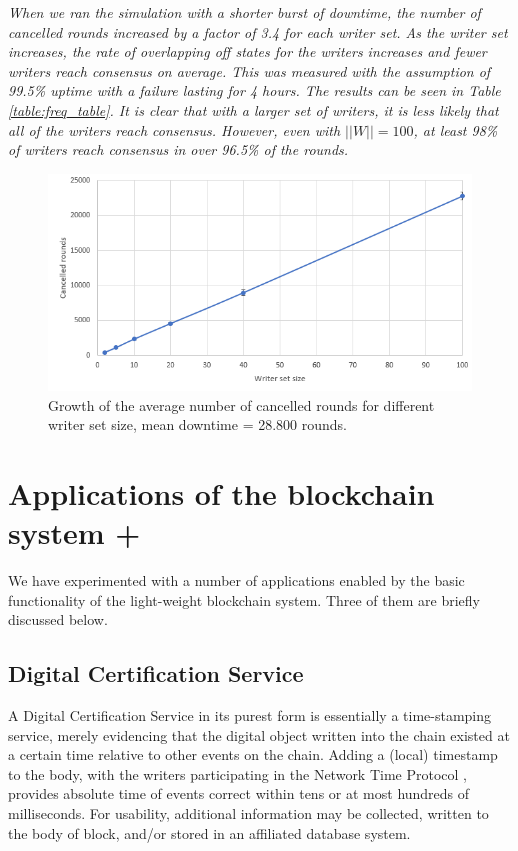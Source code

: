 \documentclass[10pt]{article}
\begin{document}
\emph{When we ran the simulation with a shorter burst of downtime, the number of cancelled rounds increased by a factor of 3.4 for each writer set. %
As the writer set increases, the rate of overlapping off states for the writers increases and fewer writers reach consensus on average. This was measured with the assumption of 99.5\% uptime with a failure lasting for 4 hours. The results can be seen in Table \ref{table:freq_table}. It is clear that with a larger set of writers, it is less likely that all of the writers reach consensus. However, even with $||W|| = 100$, at least 98\% of writers reach consensus in over 96.5\% of the rounds.}




\begin{figure}[]
    \centering
   \includegraphics[scale = 0.65]{images/graf.PNG}
    \caption{Growth of the average number of cancelled rounds for different writer set size, mean downtime = 28.800 rounds.}
    \label{fig:failure_rate}
\end{figure}



\section{Applications of the blockchain system +}



We have experimented with a number of applications enabled by the basic functionality of the light-weight blockchain system. Three of them are briefly discussed below.

\subsection{Digital Certification Service}
A Digital Certification Service in its purest form is essentially a time-stamping service, merely evidencing that the digital object written into the chain existed at a certain time relative to other events on the chain. Adding a (local) timestamp to the body, with the writers participating in the Network Time Protocol \cite{NTP}, provides absolute time of events correct within tens or at most hundreds of milliseconds. For usability, additional information may be collected, written to the body of block, and/or stored in an affiliated database system.
\end{document}
